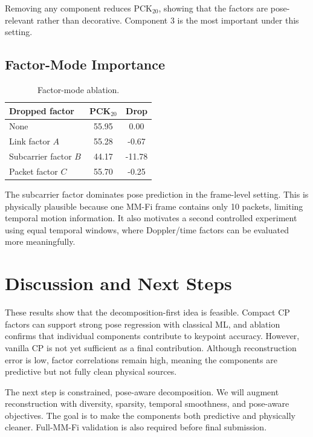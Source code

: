 Removing any component reduces PCK$_{20}$, showing that the factors are pose-relevant rather than decorative. Component 3 is the most important under this setting.

\subsection{Factor-Mode Importance}

\begin{table}[t]
\centering
\caption{Factor-mode ablation.}
\begin{tabular}{lcc}
\toprule
Dropped factor & PCK$_{20}$ & Drop \\
\midrule
None & 55.95 & 0.00 \\
Link factor $A$ & 55.28 & -0.67 \\
Subcarrier factor $B$ & 44.17 & -11.78 \\
Packet factor $C$ & 55.70 & -0.25 \\
\bottomrule
\end{tabular}
\end{table}

The subcarrier factor dominates pose prediction in the frame-level setting. This is physically plausible because one MM-Fi frame contains only 10 packets, limiting temporal motion information. It also motivates a second controlled experiment using equal temporal windows, where Doppler/time factors can be evaluated more meaningfully.

\section{Discussion and Next Steps}

These results show that the decomposition-first idea is feasible. Compact CP factors can support strong pose regression with classical ML, and ablation confirms that individual components contribute to keypoint accuracy. However, vanilla CP is not yet sufficient as a final contribution. Although reconstruction error is low, factor correlations remain high, meaning the components are predictive but not fully clean physical sources.

The next step is constrained, pose-aware decomposition. We will augment reconstruction with diversity, sparsity, temporal smoothness, and pose-aware objectives. The goal is to make the components both predictive and physically cleaner. Full-MM-Fi validation is also required before final submission.
